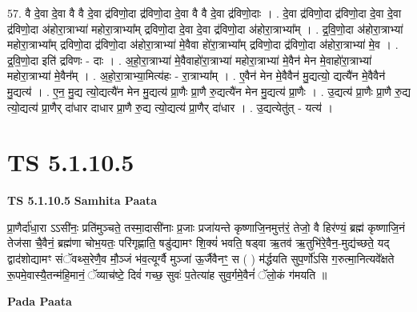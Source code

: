 \documentclass[17pt]{extarticle}
\begin{document}
57. वै दे॒वा दे॒वा वै वै दे॒वा द्र॑विणो॒दा द्र॑विणो॒दा दे॒वा वै वै दे॒वा द्र॑विणो॒दाः । . दे॒वा द्र॑विणो॒दा द्र॑विणो॒दा दे॒वा दे॒वा द्र॑विणो॒दा अ॑होरा॒त्राभ्या॑ महोरा॒त्राभ्या᳚म् द्रविणो॒दा दे॒वा दे॒वा द्र॑विणो॒दा अ॑होरा॒त्राभ्या᳚म् । . द्र॒वि॒णो॒दा अ॑होरा॒त्राभ्या॑ महोरा॒त्राभ्या᳚म् द्रविणो॒दा द्र॑विणो॒दा अ॑होरा॒त्राभ्या॑ मे॒वैवा हो॑रा॒त्राभ्या᳚म् द्रविणो॒दा द्र॑विणो॒दा अ॑होरा॒त्राभ्या॑ मे॒व । . द्र॒वि॒णो॒दा इति॑ द्रविणः - दाः । . अ॒हो॒रा॒त्राभ्या॑ मे॒वैवाहो॑रा॒त्राभ्या॑ महोरा॒त्राभ्या॑ मे॒वैन॑ मेन मे॒वाहो॑रा॒त्राभ्या॑ महोरा॒त्राभ्या॑ मे॒वैन᳚म् । . अ॒हो॒रा॒त्राभ्या॒मित्य॑हः - रा॒त्राभ्या᳚म् । . ए॒वैन॑ मेन मे॒वैवैन॑ मु॒द्यत्यो॒ द्यत्यै॑न मे॒वैवैन॑ मु॒द्यत्य॑ । . ए॒न॒ मु॒द्य त्यो॒द्यत्यै॑न मेन मु॒द्यत्य॑ प्रा॒णैः प्रा॒णै रु॒द्यत्यै॑न मेन मु॒द्यत्य॑ प्रा॒णैः । . उ॒द्यत्य॑ प्रा॒णैः प्रा॒णै रु॒द्य त्यो॒द्यत्य॑ प्रा॒णैर् दा॑धार दाधार प्रा॒णै रु॒द्य त्यो॒द्यत्य॑ प्रा॒णैर् दा॑धार । . उ॒द्यत्येतु॑त् - यत्य॑ । \newline
\pagebreak
{}

\section{ TS 5.1.10.5 }

\textbf{TS 5.1.10.5 } \newline
\textbf{Samhita Paata} \newline

प्रा॒णैर्दा॑धा॒रा ऽऽसी॑नः॒ प्रति॑मुञ्चते॒ तस्मा॒दासी॑नाः प्र॒जाः प्रजा॑यन्ते कृष्णाजि॒नमुत्त॑रं॒ तेजो॒ वै हिर॑ण्यं॒ ब्रह्म॑ कृष्णाजि॒नं तेज॑सा चै॒वैनं॒ ब्रह्म॑णा चोभ॒यतः॒ परि॑गृह्णाति॒ षडु॑द्यामꣳ शि॒क्यं॑ भवति॒ षड्वा ऋ॒तव॑ ऋ॒तुभि॑रे॒वैन॒-मुद्य॑च्छते॒ यद् द्वाद॑शोद्यामꣳ संॅवथ्स॒रेणै॒व मौ॒ञ्जं भ॑व॒त्यूर्ग्वै मुञ्जा॑ ऊ॒र्जैवैनꣳ॒॒ स ( ) म॑र्द्धयति सुप॒र्णो॑ऽसि ग॒रुत्मा॒नित्यवे᳚क्षते रू॒पमे॒वास्यै॒तन्म॑हि॒मानं॒ ॅव्याच॑ष्टे॒ दिवं॑ गच्छ॒ सुवः॑ प॒तेत्या॑ह सुव॒र्गमे॒वैनं॑ ॅलो॒कं ग॑मयति ॥ \newline

\textbf{Pada Paata} \newline
\end{document}
